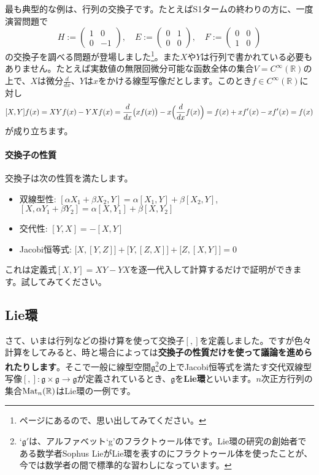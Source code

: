 最も典型的な例は、行列の交換子です。たとえばS1タームの終わりの方に、一度演習問題で
\[
H := 
\begin{pmatrix}
1 & 0 \\
0 & -1
\end{pmatrix}, \quad
E := 
\begin{pmatrix}
0 & 1 \\
0 & 0
\end{pmatrix}, \quad
F := 
\begin{pmatrix}
0 & 0 \\
1 & 0
\end{pmatrix}
\]
の交換子を調べる問題が登場しました\footnote{\pageref{paragraph:commutator}ページにあるので、思い出してみてください。}。また$X$や$Y$は行列で書かれている必要もありません。たとえば実数値の無限回微分可能な函数全体の集合$V = C^{\infty}(\mathbb{R})$の上で、$X$は微分$\frac{d}{dx}$、$Y$は$x$をかける線型写像だとします。このとき$f \in C^{\infty}(\mathbb{R})$に対し
\[
[X, Y]f(x) = XY f(x) - YX f(x) = \frac{d}{dx} \bigl(x f(x)\bigr) - x\Bigl(\frac{d}{dx} f(x)\Bigr) = f(x) + x f'(x) - x f'(x) =  f(x)
\]
が成り立ちます。

\paragraph{交換子の性質}

交換子は次の性質を満たします。
\begin{itemize}
\item 双線型性: $[\alpha X_1 + \beta X_2, Y] = \alpha[X_1, Y] + \beta[X_2, Y]$, $[X, \alpha Y_1 + \beta Y_2] = \alpha [X, Y_1] + \beta [X, Y_2]$
\item 交代性: $[Y, X] = -[X, Y]$
\item Jacobi恒等式: $\bigl[X, [Y, Z]\bigr] + \bigl[Y, [Z, X]\bigr] + \bigl[Z, [X, Y]\bigr] = 0$
\end{itemize}
これは定義式$[X, Y] = XY - YX$を逐一代入して計算するだけで証明ができます。試してみてください。

\subsection{Lie環}

さて、いまは行列などの掛け算を使って交換子$[, ]$を定義しました。ですが色々計算をしてみると、時と場合によっては\textbf{交換子の性質だけを使って議論を進められたりします}。そこで一般に線型空間$\mathfrak{g}$\footnote{`$\mathfrak{g}'$は、アルファベット`g'のフラクトゥール体です。Lie環の研究の創始者である数学者Sophus LieがLie環を表すのにフラクトゥール体を使ったことが、今では数学者の間で標準的な習わしになっています。}の上でJacobi恒等式を満たす交代双線型写像$[, ]\colon \mathfrak{g}\times\mathfrak{g}\rightarrow\mathfrak{g}$が定義されているとき、$\mathfrak{g}$を\textbf{Lie環}といいます。$n$次正方行列の集合$\operatorname{Mat}_n(\mathbb{R})$はLie環の一例です。

